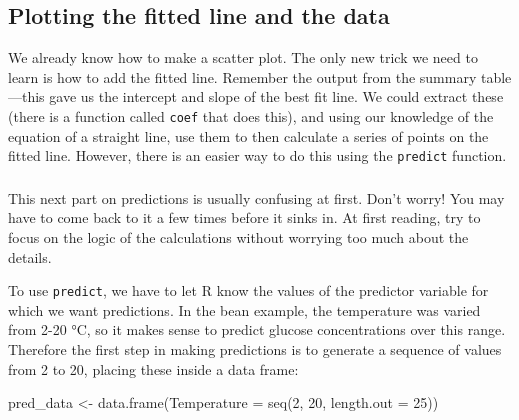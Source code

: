 \documentclass[
]{book}
\newenvironment{Shaded}{\begin{snugshade}}{\end{snugshade}}
\newcommand{\AttributeTok}[1]{\textcolor[rgb]{0.77,0.63,0.00}{#1}}
\newcommand{\DecValTok}[1]{\textcolor[rgb]{0.00,0.00,0.81}{#1}}
\newcommand{\FunctionTok}[1]{\textcolor[rgb]{0.00,0.00,0.00}{#1}}
\newcommand{\NormalTok}[1]{#1}
\newcommand{\OtherTok}[1]{\textcolor[rgb]{0.56,0.35,0.01}{#1}}
\newenvironment{greybox}{
  \definecolor{shadecolor}{rgb}{0.95,0.95,0.95}  %
  \color{black}
  \begin{shaded}}
 {\end{shaded}}
\newenvironment{infobox}[1]
  {
  \begin{itemize}
  \renewcommand{\labelitemi}{
    \raisebox{-.7\height}[0pt][0pt]{
      {\setkeys{Gin}{width=3em,keepaspectratio}
        \texttt{[image: images/\#1]}}
    }
  }
  \setlength{\fboxsep}{1em}
  \begin{greybox}
  \item
  }
  {
  \end{greybox}
  \end{itemize}
  }
\begin{document}
\hypertarget{plotting-the-fitted-line-and-the-data}{%
\subsection{Plotting the fitted line and the data}\label{plotting-the-fitted-line-and-the-data}}

We already know how to make a scatter plot. The only new trick we need to learn is how to add the fitted line. Remember the output from the summary table---this gave us the intercept and slope of the best fit line. We could extract these (there is a function called \texttt{coef} that does this), and using our knowledge of the equation of a straight line, use them to then calculate a series of points on the fitted line. However, there is an easier way to do this using the \texttt{predict} function.

\begin{infobox}{action}

\hypertarget{section-7}{%
\subsubsection*{}\label{section-7}}

This next part on predictions is usually confusing at first. Don't worry! You may have to come back to it a few times before it sinks in. At first reading, try to focus on the logic of the calculations without worrying too much about the details.

\end{infobox}

To use \texttt{predict}, we have to let R know the values of the predictor variable for which we want predictions. In the bean example, the temperature was varied from 2-20 °C, so it makes sense to predict glucose concentrations over this range. Therefore the first step in making predictions is to generate a sequence of values from 2 to 20, placing these inside a data frame:

\begin{Shaded}
\begin{Highlighting}[]
\NormalTok{pred\_data }\OtherTok{\textless{}{-}} \FunctionTok{data.frame}\NormalTok{(}\AttributeTok{Temperature =} \FunctionTok{seq}\NormalTok{(}\DecValTok{2}\NormalTok{, }\DecValTok{20}\NormalTok{, }\AttributeTok{length.out =} \DecValTok{25}\NormalTok{))}
\end{Highlighting}
\end{Shaded}
\end{document}
